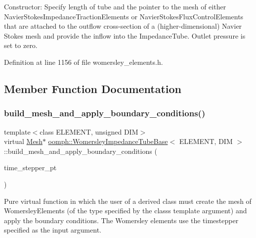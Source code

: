 Constructor\+: Specify length of tube and the pointer to the mesh of either Navier\+Stokes\+Impedance\+Traction\+Elements or Navier\+Stokes\+Flux\+Control\+Elements that are attached to the outflow cross-\/section of a (higher-\/dimensional) Navier Stokes mesh and provide the inflow into the Impedance\+Tube. Outlet pressure is set to zero. 



Definition at line 1156 of file womersley\+\_\+elements.\+h.



\subsection{Member Function Documentation}
\mbox{\label{classoomph_1_1WomersleyImpedanceTubeBase_afbe4fd4a9e8275b010ea210a9f8b1fee}} 
\subsubsection{\texorpdfstring{build\+\_\+mesh\+\_\+and\+\_\+apply\+\_\+boundary\+\_\+conditions()}{build\_mesh\_and\_apply\_boundary\_conditions()}}
{\footnotesize\ttfamily template$<$class E\+L\+E\+M\+E\+NT, unsigned D\+IM$>$ \\
virtual \hyperlink{classoomph_1_1Mesh}{Mesh}$\ast$ \hyperlink{classoomph_1_1WomersleyImpedanceTubeBase}{oomph\+::\+Womersley\+Impedance\+Tube\+Base}$<$ E\+L\+E\+M\+E\+NT, D\+IM $>$\+::build\+\_\+mesh\+\_\+and\+\_\+apply\+\_\+boundary\+\_\+conditions (\begin{DoxyParamCaption}\item[{\hyperlink{classoomph_1_1TimeStepper}{Time\+Stepper} $\ast$}]{time\+\_\+stepper\+\_\+pt }\end{DoxyParamCaption})\hspace{0.3cm}{\ttfamily [pure virtual]}}



Pure virtual function in which the user of a derived class must create the mesh of Womersley\+Elements (of the type specified by the class\textquotesingle{}s template argument) and apply the boundary conditions. The Womersley elements use the timestepper specified as the input argument. 



